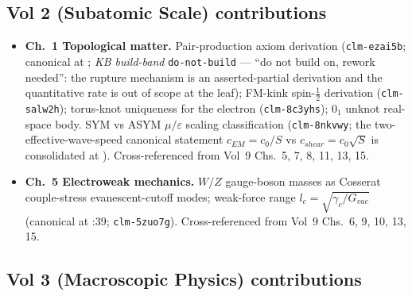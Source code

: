 \subsection{Vol 2 (Subatomic Scale) contributions}

\begin{itemize}
    \item \textbf{Ch.~1 Topological matter.} Pair-production axiom derivation (\texttt{clm-ezai5b}; canonical at ; \emph{KB build-band} \texttt{do-not-build} --- ``do not build on, rework needed'': the rupture mechanism is an asserted-partial derivation and the quantitative rate is out of scope at the leaf); FM-kink spin-$\tfrac{1}{2}$ derivation (\texttt{clm-salw2h}); torus-knot uniqueness for the electron (\texttt{clm-8c3yhs}); $0_1$ unknot real-space body. SYM vs ASYM $\mu/\varepsilon$ scaling classification (\texttt{clm-8nkvwy}; the two-effective-wave-speed canonical statement $c_{EM} = c_0/S$ vs $c_{shear} = c_0\sqrt{S}$ is consolidated at ). Cross-referenced from Vol~9 Chs.~5, 7, 8, 11, 13, 15.
    \item \textbf{Ch.~5 Electroweak mechanics.} $W$/$Z$ gauge-boson masses as Cosserat couple-stress evanescent-cutoff modes; weak-force range $l_c = \sqrt{\gamma_c/G_{vac}}$ (canonical at :39; \texttt{clm-5zuo7g}). Cross-referenced from Vol~9 Chs.~6, 9, 10, 13, 15.
\end{itemize}

\subsection{Vol 3 (Macroscopic Physics) contributions}

